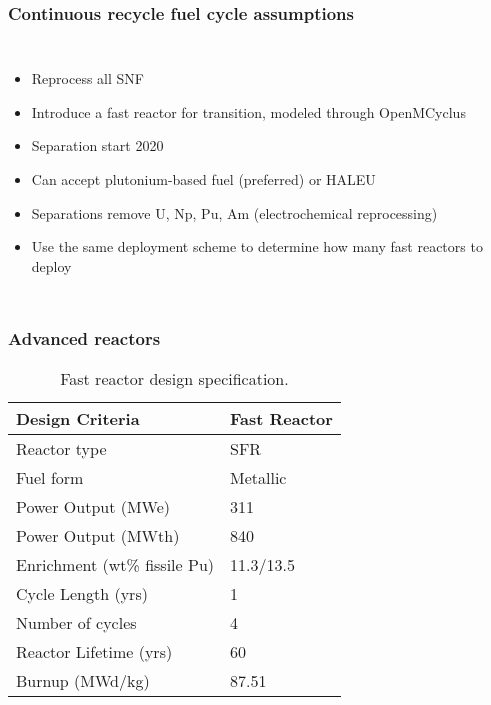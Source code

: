 \begin{frame}
    \frametitle{Continuous recycle fuel cycle assumptions}
    \begin{columns}
        
    \column[t]{6cm}
    \vspace{-0.5cm}
    

        \column[t]{4.5cm}
        \begin{itemize}
            \item Reprocess all \gls{SNF} 
            \item Introduce a fast reactor for transition, modeled through 
                  OpenMCyclus
            \item Separation start 2020
            \item Can accept plutonium-based fuel (preferred) or \gls{HALEU}
            \item Separations remove U, Np, Pu, Am (electrochemical reprocessing)
            \item<2-> Use the same deployment scheme to determine how many fast 
                  reactors to deploy
        \end{itemize}

\end{columns}
\end{frame}

\begin{frame}
    \frametitle{Advanced reactors}
    \vspace{-0.7cm}
    \begingroup
        \renewcommand{\arraystretch}{1.2}
        \begin{table}
            \centering
            \begin{threeparttable}
        
            \caption{Fast reactor design specification.}
            \label{tab:fast_rx}
            \begin{tabular}{l l}
                \hline
                Design Criteria & Fast Reactor\cite{fichtlscherer_assessing_2019,triplett_prism:_2012}\\
                \hline
                Reactor type & \acrfull{SFR} \\
                Fuel form &  Metallic \\
                Power Output (MWe) & 311 \\
                Power Output (MWth) & 840 \\
                Enrichment (wt\% fissile Pu) &  11.3/13.5\\
                Cycle Length (yrs) & 1 \\
                Number of cycles &  4 \\
                Reactor Lifetime (yrs)&  60\\
                Burnup (MWd/kg) & 87.51 \\
                \hline
            \end{tabular}
        \end{threeparttable}
        \end{table} 
    \endgroup
\end{frame}
